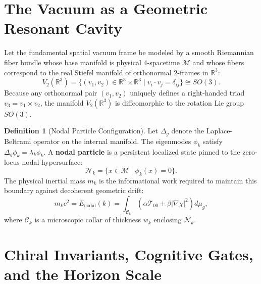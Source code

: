 \documentclass[11pt,a4paper]{article}
\theoremstyle{plain}
\theoremstyle{definition}
\newtheorem{definition}[theorem]{Definition}
\theoremstyle{remark}
\begin{document}
\section{The Vacuum as a Geometric Resonant Cavity}

Let the fundamental spatial vacuum frame be modeled by a smooth Riemannian fiber bundle whose base manifold is physical 4-spacetime $\mathcal{M}$ and whose fibers correspond to the real Stiefel manifold of orthonormal 2-frames in $\mathbb{R}^3$:
\begin{equation}
V_2(\mathbb{R}^3) = \{ (v_1, v_2) \in \mathbb{R}^3 \times \mathbb{R}^3 \mid v_i \cdot v_j = \delta_{ij} \} \cong SO(3).
\end{equation}
Because any orthonormal pair $(v_1, v_2)$ uniquely defines a right-handed triad $v_3 = v_1 \times v_2$, the manifold $V_2(\mathbb{R}^3)$ is diffeomorphic to the rotation Lie group $SO(3)$.

\begin{definition}[Nodal Particle Configuration]
Let $\Delta_g$ denote the Laplace-Beltrami operator on the internal manifold. The eigenmodes $\phi_k$ satisfy $\Delta_g \phi_k = \lambda_k \phi_k$. A \textbf{nodal particle} is a persistent localized state pinned to the zero-locus nodal hypersurface:
\begin{equation}
\mathcal{N}_k = \{ x \in \mathcal{M} \mid \phi_k(x) = 0 \}.
\end{equation}
The physical inertial mass $m_k$ is the informational work required to maintain this boundary against decoherent geometric drift:
\begin{equation}
m_k c^2 = E_{\text{nodal}}(k) = \int_{\mathcal{C}_k} \left( \alpha \mathcal{T}_{00} + \beta |\nabla \chi|^2 \right) d\mu_g,
\end{equation}
where $\mathcal{C}_k$ is a microscopic collar of thickness $w_k$ enclosing $\mathcal{N}_k$.
\end{definition}

\section{Chiral Invariants, Cognitive Gates, and the Horizon Scale}
\end{document}
